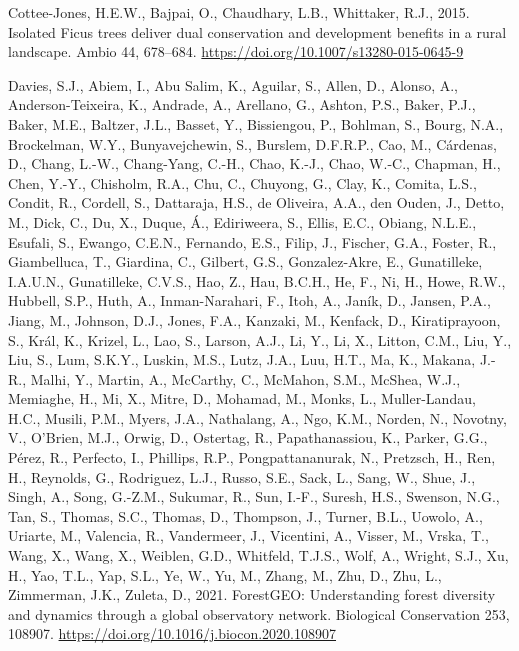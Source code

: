 \documentclass[
  12pt,
]{article}
\newlength{\cslhangindent}
\newlength{\cslentryspacingunit} %
\newenvironment{CSLReferences}[2] %
 {%
  \setlength{\parindent}{0pt}
  \ifodd #1
  \let\oldpar\par
  \def\par{\hangindent=\cslhangindent\oldpar}
  \fi
  \setlength{\parskip}{#2\cslentryspacingunit}
 }%
 {}
\begin{document}
\begin{CSLReferences}{1}{0}
\leavevmode{}%
Cottee-Jones, H.E.W., Bajpai, O., Chaudhary, L.B., Whittaker, R.J., 2015. Isolated {Ficus} trees deliver dual conservation and development benefits in a rural landscape. Ambio 44, 678--684. \url{https://doi.org/10.1007/s13280-015-0645-9}

\leavevmode{}%
Davies, S.J., Abiem, I., Abu Salim, K., Aguilar, S., Allen, D., Alonso, A., Anderson-Teixeira, K., Andrade, A., Arellano, G., Ashton, P.S., Baker, P.J., Baker, M.E., Baltzer, J.L., Basset, Y., Bissiengou, P., Bohlman, S., Bourg, N.A., Brockelman, W.Y., Bunyavejchewin, S., Burslem, D.F.R.P., Cao, M., Cárdenas, D., Chang, L.-W., Chang-Yang, C.-H., Chao, K.-J., Chao, W.-C., Chapman, H., Chen, Y.-Y., Chisholm, R.A., Chu, C., Chuyong, G., Clay, K., Comita, L.S., Condit, R., Cordell, S., Dattaraja, H.S., de Oliveira, A.A., den Ouden, J., Detto, M., Dick, C., Du, X., Duque, Á., Ediriweera, S., Ellis, E.C., Obiang, N.L.E., Esufali, S., Ewango, C.E.N., Fernando, E.S., Filip, J., Fischer, G.A., Foster, R., Giambelluca, T., Giardina, C., Gilbert, G.S., Gonzalez-Akre, E., Gunatilleke, I.A.U.N., Gunatilleke, C.V.S., Hao, Z., Hau, B.C.H., He, F., Ni, H., Howe, R.W., Hubbell, S.P., Huth, A., Inman-Narahari, F., Itoh, A., Janík, D., Jansen, P.A., Jiang, M., Johnson, D.J., Jones, F.A., Kanzaki, M., Kenfack, D., Kiratiprayoon, S., Král, K., Krizel, L., Lao, S., Larson, A.J., Li, Y., Li, X., Litton, C.M., Liu, Y., Liu, S., Lum, S.K.Y., Luskin, M.S., Lutz, J.A., Luu, H.T., Ma, K., Makana, J.-R., Malhi, Y., Martin, A., McCarthy, C., McMahon, S.M., McShea, W.J., Memiaghe, H., Mi, X., Mitre, D., Mohamad, M., Monks, L., Muller-Landau, H.C., Musili, P.M., Myers, J.A., Nathalang, A., Ngo, K.M., Norden, N., Novotny, V., O'Brien, M.J., Orwig, D., Ostertag, R., Papathanassiou, K., Parker, G.G., Pérez, R., Perfecto, I., Phillips, R.P., Pongpattananurak, N., Pretzsch, H., Ren, H., Reynolds, G., Rodriguez, L.J., Russo, S.E., Sack, L., Sang, W., Shue, J., Singh, A., Song, G.-Z.M., Sukumar, R., Sun, I.-F., Suresh, H.S., Swenson, N.G., Tan, S., Thomas, S.C., Thomas, D., Thompson, J., Turner, B.L., Uowolo, A., Uriarte, M., Valencia, R., Vandermeer, J., Vicentini, A., Visser, M., Vrska, T., Wang, X., Wang, X., Weiblen, G.D., Whitfeld, T.J.S., Wolf, A., Wright, S.J., Xu, H., Yao, T.L., Yap, S.L., Ye, W., Yu, M., Zhang, M., Zhu, D., Zhu, L., Zimmerman, J.K., Zuleta, D., 2021. {ForestGEO}: {Understanding} forest diversity and dynamics through a global observatory network. Biological Conservation 253, 108907. \url{https://doi.org/10.1016/j.biocon.2020.108907}


\end{CSLReferences}
\end{document}
